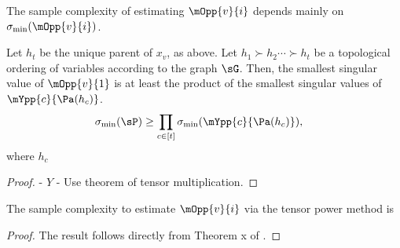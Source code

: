 The sample complexity of estimating $\mOpp{v}{i}$ depends mainly on
$\sigma_{\min}(\mOpp{v}{i})$. 

\begin{lemma}
  \label{lem:mopp-singular-values}

Let $h_t$ be the unique parent of $x_v$, as above.
Let $h_1 \succ h_2 \cdots \succ h_t$ be a topological ordering of
  variables according to the graph $\sG$.
  Then, the smallest singular value of $\mOpp{v}{1}$ is at least the product of the smallest singular values of $\mYpp{c}{\Pa(h_c)}$.
\begin{align*}
  \sigma_{\min}(\sP) &\ge \prod_{c \in [t]} \sigma_{\min}(\mYpp{c}{\Pa(h_c)}),
\end{align*}
where $h_c$

\end{lemma}
\begin{proof}
  - $Y$
  - Use theorem of tensor multiplication.
\end{proof}

\begin{lemma}
  \label{lem:sample-complexity}
  The sample complexity to estimate $\mOpp{v}{i}$ via the tensor power method \citep{anandkumar13tensor} is 
\end{lemma}
\begin{proof}
  The result follows directly from Theorem x of \citet{anandkumar13tensor}.
\end{proof}




